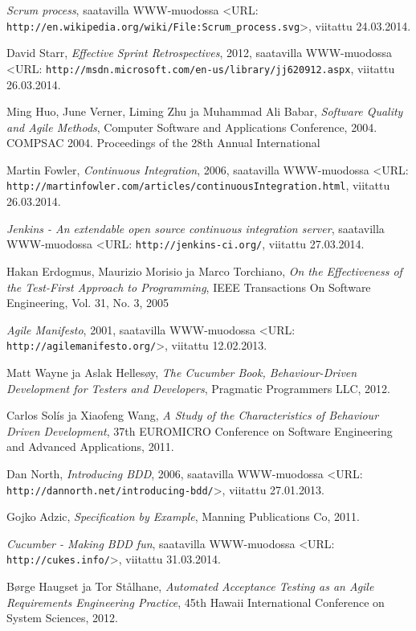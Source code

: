 \documentclass[finnish,nonumbib,nocopyright]{gradu2}
\begin{document}
\begin{thebibliography}{9}
\textit{Scrum process}, saatavilla WWW-muodossa
<URL: \texttt{http://en.wikipedia.org/wiki/File:Scrum\_process.svg}>, viitattu 24.03.2014.

David Starr, \textit{Effective Sprint Retrospectives}, 2012, saatavilla WWW-muodossa
<URL: \texttt{http://msdn.microsoft.com/en-us/library/jj620912.aspx}, viitattu 26.03.2014.

Ming Huo, June Verner, Liming Zhu ja Muhammad Ali Babar, \textit{Software Quality and Agile Methods}, 
Computer Software and Applications Conference, 2004. COMPSAC 2004. Proceedings of the 28th Annual International

Martin Fowler, \textit{Continuous Integration}, 2006, saatavilla WWW-muodossa
<URL: \texttt{http://martinfowler.com/articles/continuousIntegration.html}, viitattu 26.03.2014.

\textit{Jenkins - An extendable open source continuous integration server}, saatavilla WWW-muodossa
<URL: \texttt{http://jenkins-ci.org/}, viitattu 27.03.2014.

Hakan Erdogmus, Maurizio Morisio ja Marco Torchiano, \textit{On the Effectiveness of the Test-First Approach to Programming}, IEEE Transactions On Software Engineering, Vol. 31, No. 3, 2005

\textit{Agile Manifesto}, 2001, saatavilla WWW-muodossa
<URL: \texttt{http://agilemanifesto.org/}>, viitattu 12.02.2013.

Matt Wayne ja Aslak Hellesøy, \textit{The Cucumber Book, Behaviour-Driven Development for Testers and Developers},
Pragmatic Programmers LLC, 2012.

Carlos Solís ja Xiaofeng Wang, \textit{A Study of the Characteristics of Behaviour Driven Development},
37th EUROMICRO Conference on Software Engineering and Advanced Applications, 2011.

Dan North, \textit{Introducing BDD}, 2006, saatavilla WWW-muodossa
<URL: \texttt{http://dannorth.net/introducing-bdd/}>, viitattu 27.01.2013.

Gojko Adzic, \textit{Specification by Example},
Manning Publications Co, 2011.

\textit{Cucumber - Making BDD fun}, saatavilla WWW-muodossa
<URL: \texttt{http://cukes.info/}>, viitattu 31.03.2014.

Børge Haugset ja Tor Stålhane, \textit{Automated Acceptance Testing as an Agile Requirements Engineering Practice},
45th Hawaii International Conference on System Sciences, 2012.


\end{thebibliography}
\end{document}
